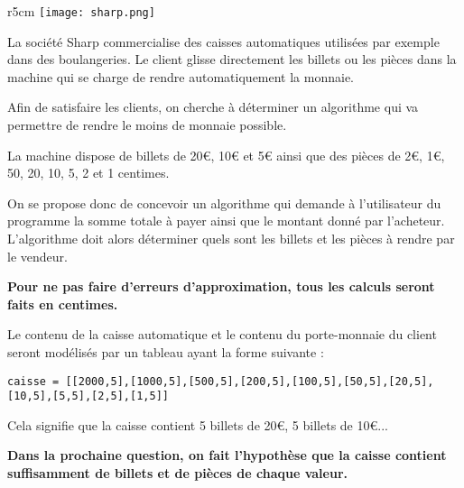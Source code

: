 \setcounter{numques}{0}

\begin{wrapfigure}{r}{5cm}
\centering
\texttt{[image: sharp.png]}
\end{wrapfigure} 

La société Sharp commercialise des caisses automatiques utilisées par exemple dans des boulangeries. Le client glisse directement les billets ou les pièces dans la machine qui se charge de rendre automatiquement la monnaie. 
\begin{obj}
Afin de satisfaire les clients, on cherche à déterminer un algorithme qui va permettre de rendre le moins de monnaie possible. 
\end{obj}

La machine dispose de billets de 20\euro{}, 10\euro{} et 5\euro{} ainsi que des pièces de 2\euro{}, 1\euro{}, 50, 20, 10, 5, 2 et 1 centimes. 

\vspace{.5cm}

On se propose donc de concevoir un algorithme qui demande à l'utilisateur du programme la somme totale à payer ainsi que le montant donné par l'acheteur. L'algorithme doit alors déterminer quels sont les billets et les pièces à rendre par le vendeur. 

\textbf{Pour ne pas faire d'erreurs d'approximation, tous les calculs seront faits en centimes.}

Le contenu de la caisse automatique et le contenu du porte-monnaie du client seront modélisés par un tableau ayant la forme suivante : 
\begin{lstlisting}
caisse = [[2000,5],[1000,5],[500,5],[200,5],[100,5],[50,5],[20,5],[10,5],[5,5],[2,5],[1,5]]
\end{lstlisting}
Cela signifie que la caisse contient 5 billets de 20\euro{}, 5 billets de 10\euro{}... 




\textbf{Dans la prochaine question, on fait l'hypothèse que la caisse contient suffisamment de billets et de pièces de chaque valeur.}

